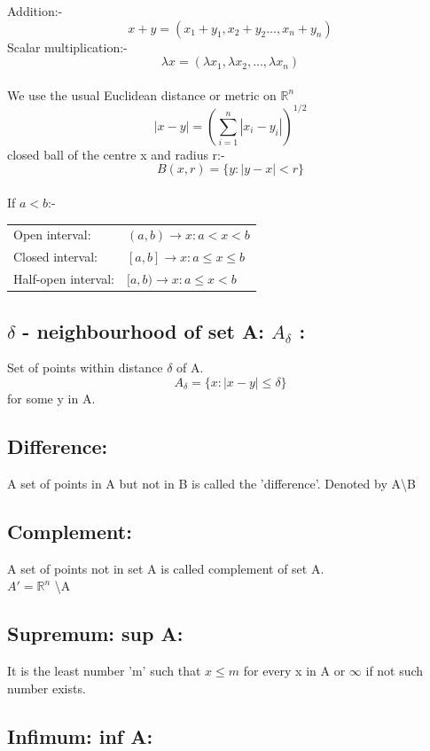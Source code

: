 \documentclass[14pt]{extarticle}
\begin{document}
\begin{enumerate}
Addition:- $$ x+y=(x_1+y_1,x_2+y_2...,x_n+y_n)$$
Scalar multiplication:- $$\lambda x=(\lambda x_1,\lambda x_2,...,\lambda x_n)$$\\
We use the usual Euclidean distance or metric on $\mathbb{R}^n$\\
$$|x-y|=\left(\sum_{i=1}^{n}|x_i-y_i|\right)^{1/2}$$
closed ball of the centre x and radius r:-\\
$$B(x,r)=\{y:|y-x|<r\}$$\\
If $a<b$:-\\

\begin{tabular}{ll}
Open interval:&$(a,b) \rightarrow{x:a<x<b}$\\
Closed interval:&$[a,b] \rightarrow{x:a\leq x\leq b}$\\
Half-open interval:&$[a,b) \rightarrow{x:a\leq x<b}$\\
\end{tabular}

\subsection{$\delta$ - neighbourhood of set A: $A_\delta$ :}

Set of points within distance $\delta$ of A.\\
$$A_\delta = \{x:|x-y|\leq\delta\}$$ for some y in A.
\subsection{Difference:}  
A set of points in A but not in B is called the 'difference'. Denoted by A\textbackslash B 
\subsection{Complement:}
A set of points not in set A is called complement of set A.\\ 
$ A'=\mathbb{R}^n$ \textbackslash A

\subsection{Supremum: sup A:}
It is the least number 'm' such that $x\leq m$ for every x in A or $\infty$ if not such number exists.

\subsection{Infimum: inf A:}


\end{enumerate}
\end{document}
